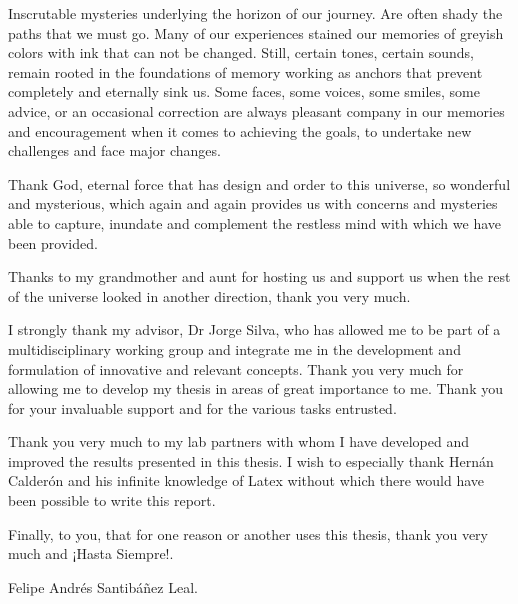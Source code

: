\begin{thanks}

Inscrutable mysteries underlying the horizon of our journey. Are often shady the paths that we must go. Many of our experiences stained our memories of greyish colors with ink that can not be changed. Still, certain tones, certain sounds, remain rooted in the foundations of memory working as anchors that prevent completely and eternally sink us. Some faces, some voices, some smiles, some advice, or an occasional correction are always pleasant company in our memories and encouragement when it comes to achieving the goals, to undertake new challenges and face major changes.

Thank God, eternal force that has design and order to this universe, so wonderful and mysterious, which again and again provides us with concerns and mysteries able to capture, inundate and complement the restless mind with which we have been provided.


Thanks to my grandmother and aunt for hosting us and support us when the rest of the universe looked in another direction, thank you very much.

I strongly thank my advisor, Dr Jorge Silva, who has allowed me to be part of a multidisciplinary working group and integrate me in the development and formulation of innovative and relevant concepts. Thank you very much for allowing me to develop my thesis in areas of great importance to me. Thank you for your invaluable support and for the various tasks entrusted.

Thank you very much to my lab partners with whom I have developed and improved the results presented in this thesis. I wish to especially thank Hern\'an Calder\'on and his infinite knowledge of Latex without which there would have been possible to write this report.

Finally, to you, that for one reason or another uses this thesis, thank you very much and ¡Hasta Siempre!.

\begin{flushright}
Felipe Andr\'es Santib\'añez Leal.
\end{flushright}

\end{thanks}